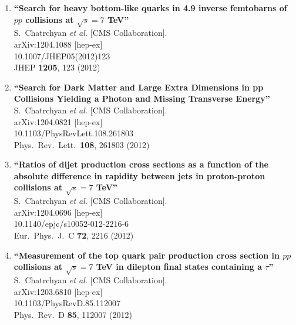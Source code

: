 \documentclass{article}
\begin{document}
\begin{enumerate}
\item%
{\bf ``Search for heavy bottom-like quarks in 4.9 inverse femtobarns of $pp$ collisions at $\sqrt{s}=7$ TeV''}
  \\{}S.~Chatrchyan {\it et al.}  [CMS Collaboration].
  \\{}arXiv:1204.1088 [hep-ex]
    \\{}10.1007/JHEP05(2012)123
\\{}JHEP {\bf 1205}, 123 (2012) %


\item%
{\bf ``Search for Dark Matter and Large Extra Dimensions in pp Collisions Yielding a Photon and Missing Transverse Energy''}
  \\{}S.~Chatrchyan {\it et al.}  [CMS Collaboration].
  \\{}arXiv:1204.0821 [hep-ex]
    \\{}10.1103/PhysRevLett.108.261803
\\{}Phys.\ Rev.\ Lett.\  {\bf 108}, 261803 (2012) %


\item%
{\bf ``Ratios of dijet production cross sections as a function of the absolute difference in rapidity between jets in proton-proton collisions at $\sqrt{s}=7$ TeV''}
  \\{}S.~Chatrchyan {\it et al.}  [CMS Collaboration].
  \\{}arXiv:1204.0696 [hep-ex]
    \\{}10.1140/epjc/s10052-012-2216-6
\\{}Eur.\ Phys.\ J.\ C {\bf 72}, 2216 (2012) %


\item%
{\bf ``Measurement of the top quark pair production cross section in $pp$ collisions at $\sqrt{s} = 7$ TeV in dilepton final states containing a $\tau$''}
  \\{}S.~Chatrchyan {\it et al.}  [CMS Collaboration].
  \\{}arXiv:1203.6810 [hep-ex]
    \\{}10.1103/PhysRevD.85.112007
\\{}Phys.\ Rev.\ D {\bf 85}, 112007 (2012) %



\end{enumerate}
\end{document}

